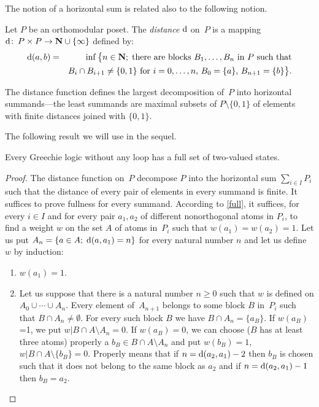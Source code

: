 The notion of a horizontal sum is related also to the following notion.


\begin {definition}
Let $P$ be an orthomodular poset. The {\em distance\/} ${\rm d}$ on~$P$ is a
mapping ${\rm d}\colon\, P \times P \to {\bf N} \cup \{\infty\}$ defined by:
  \begin {eqnarray*}
  {\rm d}(a,b) &=& \inf \big\{ n \in {\bf N};\;
    \mbox{there are blocks $B_1,\ldots,B_n$ in $P$ such that}\\
    &&
    \mbox {$B_i \cap B_{i+1} \neq \{0,1\}$ for $i=0,\ldots,n$,
           $B_0 = \{a\}$, $B_{n+1} = \{b\}$} \big\}.
  \end {eqnarray*}
\end {definition}


The distance function defines the largest decomposition of~$P$ into
horizontal summands---the least summands are maximal subsets of $P \setminus
\{0,1\}$ of elements with finite distances joined with $\{0,1\}$.

The following result we will use in the sequel.


\begin {proposition} \label{noloop-concrete}
Every Greechie logic without any loop has a full set of two-valued states.
\end {proposition}


\begin {proof}
The distance function on~$P$ decompose $P$ into the horizontal sum $\sum_{i
\in I} P_i$ such that the distance of every pair of elements in every
summand is finite. It suffices to prove fullness for every summand. According
to \ref{full}, it suffices, for every $i\in I$ and for every pair $a_1,a_2$
of different nonorthogonal atoms in $P_i$, to find a weight $w$ on the set
$A$ of atoms in~$P_i$ such that $w(a_1) = w(a_2) = 1$. Let us put $A_n= \{a
\in A;\; {\rm d}(a,a_1)=n \}$ for every natural number $n$ and let us define
$w$ by induction:
  \begin {enumerate}
  \item [I.] $w(a_1)=1$.
  \item [II.]
  Let us suppose that there is a natural number $n\ge 0$ such that $w$ is
  defined on $A_0 \cup \cdots \cup A_n$. Every element of~$A_{n+1}$ belongs
  to some block $B$ in~$P_i$ such that $B \cap A_n \neq \emptyset$. For
  every such block $B$ we have $B \cap A_n = \{a_B\}$. If $w(a_B)$=1, we
  put $w|B \cap A \setminus A_n = 0$. If $w(a_B)=0$, we can choose ($B$
  has at least three atoms) properly a $b_B \in B \cap A \setminus A_n$ and
  put $w(b_B)=1$, $w|B \cap A \setminus \{b_B\} = 0$. Properly means that if
  $n = {\rm d}(a_2,a_1)-2$ then $b_B$ is chosen such that it does not belong to
  the same block as $a_2$ and if $n = {\rm d}(a_2,a_1)-1$ then $b_B=a_2$.
  \end {enumerate}
\end {proof}


